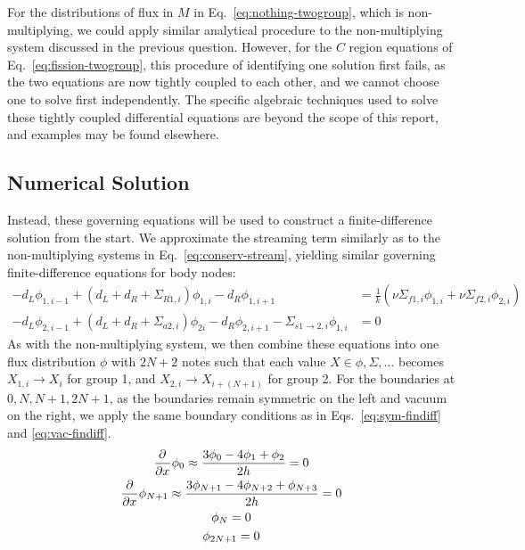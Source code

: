 \documentclass[11pt]{article} %
\begin{document}
For the distributions of flux in $M$ in Eq.~\ref{eq:nothing-twogroup}, which is non-multiplying, we could apply similar analytical procedure to the non-multiplying system discussed in the previous question.
However, for the $C$ region equations of Eq.~\ref{eq:fission-twogroup}, this procedure of identifying one solution first fails, as the two equations are now tightly coupled to each other, and we cannot choose one to solve first independently.
The specific algebraic techniques used to solve these tightly coupled differential equations are beyond the scope of this report, and examples may be found elsewhere.\cite{novak_lecture21_2026}\\
\subsection{Numerical Solution}
Instead, these governing equations will be used to construct a finite-difference solution from the start.
We approximate the streaming term similarly as to the non-multiplying systems in Eq.~\ref{eq:conserv-stream}, yielding similar governing finite-difference equations for body nodes:
\begin{equation}
    \begin{aligned}
        -d_L\phi_{1,i-1} + \left(d_L+d_R+\Sigma_{R1,i}\right)\phi_{1,i} - d_R\phi_{1,i+1} &= \frac{1}{k} \left(\nu\Sigma_{f1,i}\phi_{1,i}+\nu\Sigma_{f2,i}\phi_{2,i}\right)\\
        -d_L\phi_{2,i-1} + \left(d_L+d_R+\Sigma_{a2,i}\right)\phi_{2i} - d_R\phi_{2,i+1} - \Sigma_{s1\rightarrow2,i}\phi_{1,i} &= 0
    \end{aligned}
\end{equation}
As with the non-multiplying system, we then combine these equations into one flux distribution $\phi$ with $2N+2$ notes such that each value $X\in\phi, \Sigma, \dots$ becomes $X_{1,i}\rightarrow X_i$ for group 1, and $X_{2,i}\rightarrow X_{i+(N+1)}$ for group 2.
For the boundaries at $0, N, N+1, 2N+1$, as the boundaries remain symmetric on the left and vacuum on the right, we apply the same boundary conditions as in Eqs.~\ref{eq:sym-findiff} and \ref{eq:vac-findiff}.\\

\begin{equation}
    \begin{gathered}
        \frac{\partial^{}}{\partial{x}^{}}\phi_{0} \approx \frac{3\phi_{0}-4\phi_{1}+\phi_{2}}{2h}=0\\
        \frac{\partial^{}}{\partial{x}^{}}\phi_{N+1} \approx \frac{3\phi_{N+1}-4\phi_{N+2}+\phi_{N+3}}{2h}=0\\
        \phi_{N} = 0\\
        \phi_{2N+1} = 0
    \end{gathered}
\end{equation}
\end{document}
